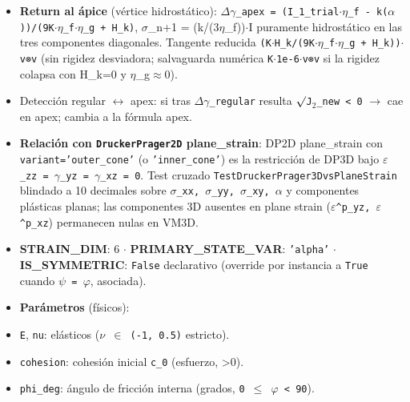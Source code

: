 \documentclass[11pt,letterpaper,oneside]{report}
\begin{document}
\begin{itemize}
  \item \textbf{Return al ápice} (vértice hidrostático): \texttt{\ensuremath{\Delta}\ensuremath{\gamma}\_apex = (I\_1\_trial\ensuremath{\cdot}\ensuremath{\eta}\_f - k(\ensuremath{\alpha}))/(9K\ensuremath{\cdot}\ensuremath{\eta}\_f\ensuremath{\cdot}\ensuremath{\eta}\_g + H\_k)}, \ensuremath{\sigma}\_n+1 = (k/(3\ensuremath{\eta}\_f))\ensuremath{\cdot}I puramente hidrostático en las tres componentes diagonales. Tangente reducida \texttt{(K\ensuremath{\cdot}H\_k/(9K\ensuremath{\cdot}\ensuremath{\eta}\_f\ensuremath{\cdot}\ensuremath{\eta}\_g + H\_k))\ensuremath{\cdot}v⊗v} (sin rigidez desviadora; salvaguarda numérica \texttt{K\ensuremath{\cdot}1e-6\ensuremath{\cdot}v⊗v} si la rigidez colapsa con H\_k=0 y \ensuremath{\eta}\_g\ensuremath{\approx}0).
  \item Detección regular \ensuremath{\leftrightarrow} apex: si tras \texttt{\ensuremath{\Delta}\ensuremath{\gamma}\_regular} resulta \texttt{\ensuremath{\surd}J\ensuremath{_{2}}\_new < 0} \ensuremath{\to} cae en apex; cambia a la fórmula apex.
  \item \textbf{Relación con \texttt{DruckerPrager2D} plane\_strain}: DP2D plane\_strain con \texttt{variant='outer\_cone'} (o \texttt{'inner\_cone'}) es la restricción de DP3D bajo \texttt{\ensuremath{\varepsilon}\_zz = \ensuremath{\gamma}\_yz = \ensuremath{\gamma}\_xz = 0}. Test cruzado \texttt{TestDruckerPrager3DvsPlaneStrain} blindado a 10 decimales sobre \texttt{\ensuremath{\sigma}\_xx, \ensuremath{\sigma}\_yy, \ensuremath{\sigma}\_xy, \ensuremath{\alpha}} y componentes plásticas planas; las componentes 3D ausentes en plane strain (\texttt{\ensuremath{\varepsilon}\textasciicircum{}p\_yz, \ensuremath{\varepsilon}\textasciicircum{}p\_xz}) permanecen nulas en VM3D.
  \item \textbf{STRAIN\_DIM}: 6 \ensuremath{\cdot} \textbf{PRIMARY\_STATE\_VAR}: \texttt{'alpha'} \ensuremath{\cdot} \textbf{IS\_SYMMETRIC}: \texttt{False} declarativo (override por instancia a \texttt{True} cuando \texttt{\ensuremath{\psi} = \ensuremath{\varphi}}, asociada).
  \item \textbf{Parámetros} (físicos):
  \item \texttt{E}, \texttt{nu}: elásticos (\texttt{\ensuremath{\nu} \ensuremath{\in} (-1, 0.5)} estricto).
  \item \texttt{cohesion}: cohesión inicial \texttt{c\_0} (esfuerzo, >0).
  \item \texttt{phi\_deg}: ángulo de fricción interna (grados, \texttt{0 \ensuremath{\le} \ensuremath{\varphi} < 90}).

\end{itemize}
\end{document}
